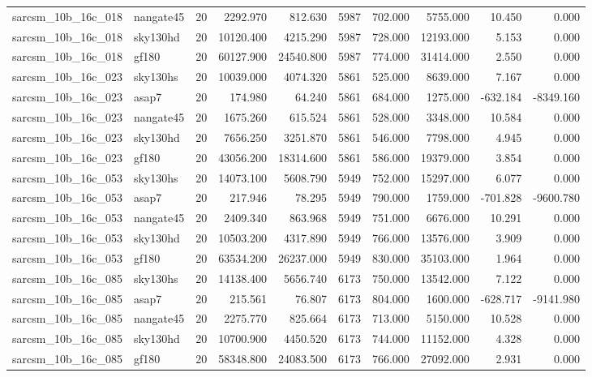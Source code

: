 \begin{tabular}{llrrrrrrrr}
sarcsm\_10b\_16c\_018 & nangate45 & 20 & 2292.970 & 812.630 & 5987 & 702.000 & 5755.000 & 10.450 & 0.000 \\
sarcsm\_10b\_16c\_018 & sky130hd & 20 & 10120.400 & 4215.290 & 5987 & 728.000 & 12193.000 & 5.153 & 0.000 \\
sarcsm\_10b\_16c\_018 & gf180 & 20 & 60127.900 & 24540.800 & 5987 & 774.000 & 31414.000 & 2.550 & 0.000 \\
sarcsm\_10b\_16c\_023 & sky130hs & 20 & 10039.000 & 4074.320 & 5861 & 525.000 & 8639.000 & 7.167 & 0.000 \\
sarcsm\_10b\_16c\_023 & asap7 & 20 & 174.980 & 64.240 & 5861 & 684.000 & 1275.000 & -632.184 & -8349.160 \\
sarcsm\_10b\_16c\_023 & nangate45 & 20 & 1675.260 & 615.524 & 5861 & 528.000 & 3348.000 & 10.584 & 0.000 \\
sarcsm\_10b\_16c\_023 & sky130hd & 20 & 7656.250 & 3251.870 & 5861 & 546.000 & 7798.000 & 4.945 & 0.000 \\
sarcsm\_10b\_16c\_023 & gf180 & 20 & 43056.200 & 18314.600 & 5861 & 586.000 & 19379.000 & 3.854 & 0.000 \\
sarcsm\_10b\_16c\_053 & sky130hs & 20 & 14073.100 & 5608.790 & 5949 & 752.000 & 15297.000 & 6.077 & 0.000 \\
sarcsm\_10b\_16c\_053 & asap7 & 20 & 217.946 & 78.295 & 5949 & 790.000 & 1759.000 & -701.828 & -9600.780 \\
sarcsm\_10b\_16c\_053 & nangate45 & 20 & 2409.340 & 863.968 & 5949 & 751.000 & 6676.000 & 10.291 & 0.000 \\
sarcsm\_10b\_16c\_053 & sky130hd & 20 & 10503.200 & 4317.890 & 5949 & 766.000 & 13576.000 & 3.909 & 0.000 \\
sarcsm\_10b\_16c\_053 & gf180 & 20 & 63534.200 & 26237.000 & 5949 & 830.000 & 35103.000 & 1.964 & 0.000 \\
sarcsm\_10b\_16c\_085 & sky130hs & 20 & 14138.400 & 5656.740 & 6173 & 750.000 & 13542.000 & 7.122 & 0.000 \\
sarcsm\_10b\_16c\_085 & asap7 & 20 & 215.561 & 76.807 & 6173 & 804.000 & 1600.000 & -628.717 & -9141.980 \\
sarcsm\_10b\_16c\_085 & nangate45 & 20 & 2275.770 & 825.664 & 6173 & 713.000 & 5150.000 & 10.528 & 0.000 \\
sarcsm\_10b\_16c\_085 & sky130hd & 20 & 10700.900 & 4450.520 & 6173 & 744.000 & 11152.000 & 4.328 & 0.000 \\
sarcsm\_10b\_16c\_085 & gf180 & 20 & 58348.800 & 24083.500 & 6173 & 766.000 & 27092.000 & 2.931 & 0.000 \\

\end{tabular}
